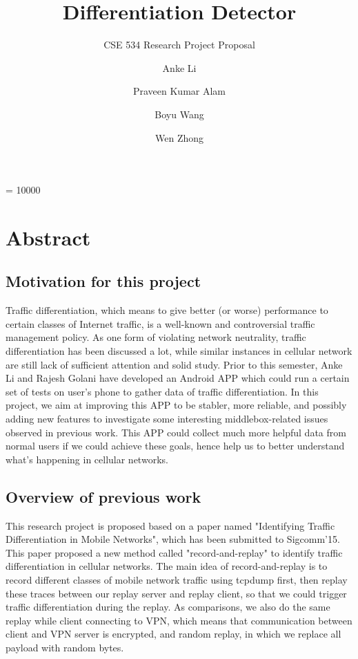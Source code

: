 \documentclass[letterpaper]{sig-alternate-10pt}
\title{Differentiation Detector}
\subtitle{CSE 534 Research Project Proposal}
\author[1]{Anke Li}
\author[1]{Praveen Kumar Alam}
\author[1]{Boyu Wang}
\author[1]{Wen Zhong}
\affil[1]{Dept. of Computer Science, Stony Brook University}
\begin{document}
\iffalse
\conferenceinfo{SIGCOMM'11,} {August 15-19, 2011, Toronto, Ontario, Canada.}
\CopyrightYear{2011}
\crdata{978-1-4503-0797-0/11/08}
\fi

\widowpenalty = 10000

\maketitle

\section{Abstract}
\subsection{Motivation for this project}
Traffic differentiation, which means to give better (or worse) performance to certain classes of Internet traffic, is a well-known and controversial traffic management policy. As one form of violating network neutrality, traffic differentiation has been discussed a lot, while similar instances in cellular network are still lack of sufficient attention and solid study. Prior to this semester, Anke Li and Rajesh Golani have developed an Android APP which could run a certain set of tests on user's phone to gather data of traffic differentiation. In this project, we aim at improving this APP to be stabler, more reliable, and possibly adding new features to investigate some interesting middlebox-related issues observed in previous work. This APP could collect much more helpful data from normal users if we could achieve these goals, hence help us to better understand what's happening in cellular networks.

\subsection{Overview of previous work}
This research project is proposed based on a paper named "Identifying Traffic Differentiation in Mobile Networks", which has been submitted to Sigcomm'15. This paper proposed a new method called "record-and-replay" to identify traffic differentiation in cellular networks. The main idea of record-and-replay is to record different classes of mobile network traffic using tcpdump first, then replay these traces between our replay server and replay client, so that we could trigger traffic differentiation during the replay. As comparisons, we also do the same replay while client connecting to VPN, which means that communication between client and VPN server is encrypted, and random replay, in which we replace all payload with random bytes.
\end{document}
